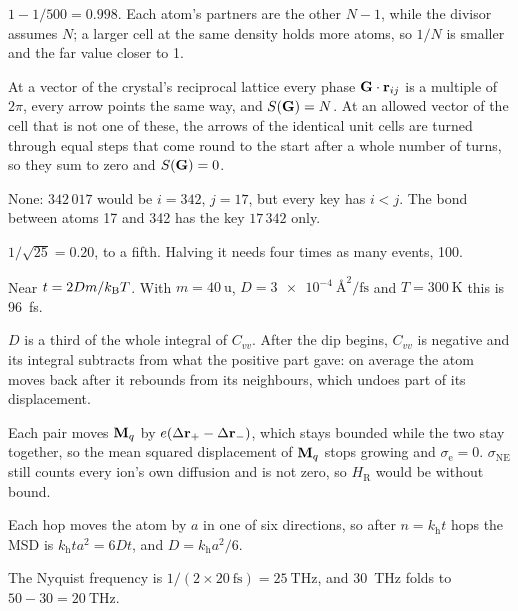 \label{sec:ob-answers}

$1 - 1/500 = 0.998$. Each atom's partners are the
other $N - 1$, while the divisor assumes $N$; a larger cell at the same
density holds more atoms, so $1/N$ is smaller and the far value closer
to 1.

At a vector of the crystal's reciprocal lattice every
phase $\bm{\mathrm{G}}\cdot\bm{\mathrm{r}}_{ij}$ is a multiple of $2\pi$, every arrow points
the same way, and $S(\bm{\mathrm{G}}) = N$. At an allowed vector of the cell that is not
one of these, the arrows of the identical unit cells are turned through
equal steps that come round to the start after a whole number of turns,
so they sum to zero and $S(\bm{\mathrm{G}}) = 0$.

None: $342\,017$ would be $i = 342$, $j = 17$, but
every key has $i < j$. The bond between atoms 17 and 342 has the key
$17\,342$ only.

$1/\sqrt{25} = 0.20$, to a fifth. Halving it
needs four times as many events, 100.

Near $t = 2Dm/k_{\mathrm{B}} T$. With $m = \SI{40}{\amu}$, $D =
\SI{3e-4}{\angstrom\squared\per\femto\second}$ and $T = \SI{300}{\kelvin}$
this is \SI{96}{\femto\second}.

$D$ is a third of the whole integral of $C_{vv}$.
After the dip begins, $C_{vv}$ is negative and its integral subtracts from
what the positive part gave: on average the atom moves back after it
rebounds from its neighbours, which undoes part of its displacement.

Each pair moves $\bm{\mathrm{M}}_q$ by $e(\Delta\bm{\mathrm{r}}_+ -
\Delta\bm{\mathrm{r}}_-)$, which stays bounded while the two stay together, so the
mean squared displacement of $\bm{\mathrm{M}}_q$ stops growing and $\sigma_{\mathrm e}
= 0$. $\sigma_{\mathrm{NE}}$ still counts every ion's own diffusion and is
not zero, so $H_{\mathrm R}$ would be without bound.

Each hop moves the atom by $a$ in one of six
directions, so after $n = k_{\mathrm h}t$ hops the MSD is $k_{\mathrm h}ta^2 = 6Dt$,
and $D = k_{\mathrm h}a^2/6$.

The Nyquist frequency is $1/(2\times
\SI{20}{\femto\second}) = \SI{25}{\tera\hertz}$, and \SI{30}{\tera\hertz}
folds to $50 - 30 = \SI{20}{\tera\hertz}$.

